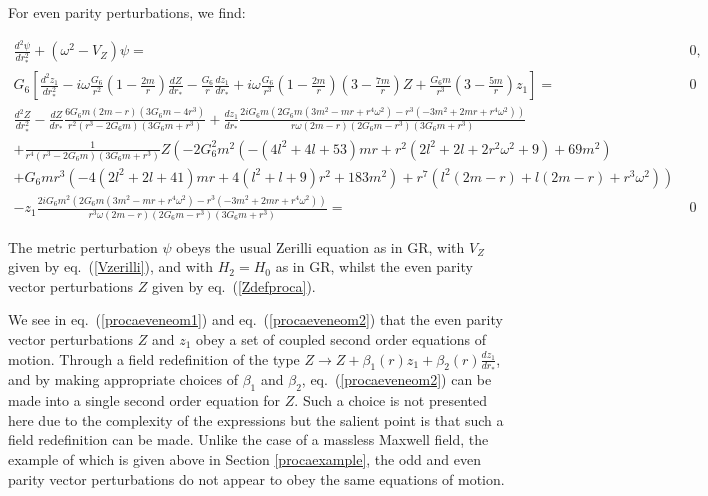 \documentclass[10pt,twocolumn,preprintnumbers,amsmath,amssymb,nofootinbib
,superscriptaddress]{revtex4-1}
\begin{document}
{{{For even parity perturbations, we find:
\begin{widetext}
\begin{align}
\frac{d^2\psi}{dr_\ast^2}+\left(\omega^2-V_Z\right)\psi=&\;0,\nonumber\\
G_6\left[\frac{d^2z_1}{dr_\ast^2}-i\omega\frac{G_6}{r^2}\left(1-\frac{2m}{r}\right)\frac{dZ}{dr_\ast}-\frac{G_6}{r}\frac{dz_1}{dr_\ast}+i\omega\frac{G_6}{r^3}\left(1-\frac{2m}{r}\right)\left(3-\frac{7m}{r}\right)Z+\frac{G_6m}{r^3}\left(3-\frac{5m}{r}\right)z_1\right]=&\;0\label{procaeveneom1}\\
 \frac{d^2Z}{dr_\ast^2} -\frac{dZ}{dr_\ast}\frac{6     G_6  m (2 m-r) \left(3  G_6  m-4 r^3\right)}{r^2 \left(r^3-2  G_6  m\right)
   \left(3  G_6  m+r^3\right)}+\frac{dz_1}{dr_\ast}\frac{2 i   G_6  m \left(2  G_6  m \left(3 m^2-m r+r^4 \omega
   ^2\right)-r^3 \left(-3 m^2+2 m r+r^4 \omega ^2\right)\right)}{r \omega  (2 m-r) \left(2  G_6  m-r^3\right) \left(3
    G_6  m+r^3\right)}&\nonumber\\
 +\frac{1}{r^4 \left(r^3-2  G_6  m\right) \left(3  G_6 
   m+r^3\right)} Z  \left(-2  G_6 ^2 m^2 \left(-\left(4 l^2+4 l+53\right) m r+r^2 \left(2 l^2+2 l+2 r^2
   \omega ^2+9\right)+69 m^2\right)\right.&\nonumber\\
  \left.+ G_6  m r^3 \left(-4 \left(2 l^2+2 l+41\right) m r+4 \left(l^2+l+9\right) r^2+183
   m^2\right)+r^7 \left(l^2 (2 m-r)+l (2 m-r)+r^3 \omega ^2\right)\right)&\nonumber\\
   -z_1\frac{2 i  G_6  m^2  \left(2  G_6  m \left(3 m^2-m r+r^4 \omega ^2\right)-r^3 \left(-3 m^2+2
   m r+r^4 \omega ^2\right)\right)}{r^3 \omega  (2 m-r) \left(2  G_6  m-r^3\right) \left(3  G_6  m+r^3\right)}=&\;0\label{procaeveneom2}
\end{align}
\end{widetext}
The metric perturbation $\psi$ obeys the usual Zerilli equation as in GR, with $V_Z$ given by eq.~(\ref{Vzerilli}), and with $H_2=H_0$ as in GR, whilst the even parity vector perturbations $Z$ given by eq.~(\ref{Zdefproca}). 

We see in eq.~(\ref{procaeveneom1}) and eq.~(\ref{procaeveneom2}) that the even parity vector perturbations $Z$ and $z_1$ obey a set of coupled second order equations of motion. Through a field redefinition of the type $Z\rightarrow Z+\beta_1(r)z_1+\beta_2(r)\frac{dz_1}{dr_\ast}$, and by making appropriate choices of $\beta_1$ and $\beta_2$, eq.~(\ref{procaeveneom2}) can be made into a single second order equation for $Z$. Such a choice is not presented here due to the complexity of the expressions but the salient point is that such a field redefinition can be made. Unlike the case of a massless Maxwell field, the example of which is given above in Section \ref{procaexample}, the odd and even parity vector perturbations do not appear to obey the same equations of motion.

}}}
\end{document}
